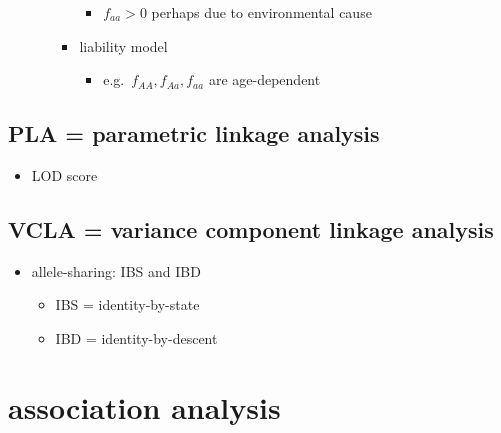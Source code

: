 \documentclass[
]{book}
\providecommand{\tightlist}{%
  \setlength{\itemsep}{0pt}\setlength{\parskip}{0pt}}
\theoremstyle{definition}
\theoremstyle{definition}
\theoremstyle{definition}
\theoremstyle{definition}
\theoremstyle{remark}
\begin{document}
\begin{itemize}
\begin{itemize}
\begin{itemize}
      \begin{itemize}
      \tightlist
      \item
        \(f_{aa} > 0\) perhaps due to environmental cause
      \end{itemize}
    \item
      liability model

      \begin{itemize}
      \tightlist
      \item
        e.g.~\(f_{AA},f_{Aa},f_{aa}\) are age-dependent
      \end{itemize}
    \end{itemize}
  \end{itemize}
\end{itemize}

\subsection{PLA = parametric linkage analysis}\label{pla-parametric-linkage-analysis}

\begin{itemize}
\tightlist
\item
  LOD score
\end{itemize}

\subsection{VCLA = variance component linkage analysis}\label{vcla-variance-component-linkage-analysis}

\begin{itemize}
\tightlist
\item
  allele-sharing: IBS and IBD

  \begin{itemize}
  \tightlist
  \item
    IBS = identity-by-state
  \item
    IBD = identity-by-descent
  \end{itemize}
\end{itemize}

\section{association analysis}\label{association-analysis}
\end{document}
